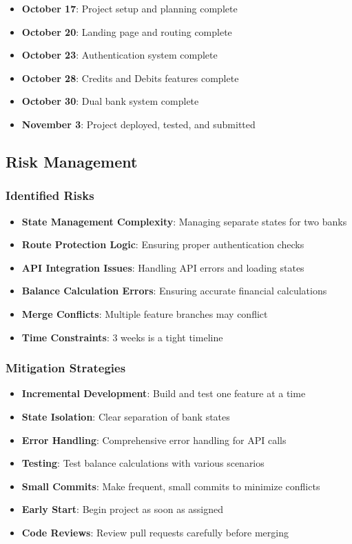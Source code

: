 \documentclass[11pt,a4paper]{article}
\begin{document}
\begin{itemize}[leftmargin=*]
    \item \textbf{October 17}: Project setup and planning complete
    \item \textbf{October 20}: Landing page and routing complete
    \item \textbf{October 23}: Authentication system complete
    \item \textbf{October 28}: Credits and Debits features complete
    \item \textbf{October 30}: Dual bank system complete
    \item \textbf{November 3}: Project deployed, tested, and submitted
\end{itemize}

\subsection{Risk Management}

\subsubsection{Identified Risks}
\begin{itemize}[leftmargin=*]
    \item \textbf{State Management Complexity}: Managing separate states for two banks
    \item \textbf{Route Protection Logic}: Ensuring proper authentication checks
    \item \textbf{API Integration Issues}: Handling API errors and loading states
    \item \textbf{Balance Calculation Errors}: Ensuring accurate financial calculations
    \item \textbf{Merge Conflicts}: Multiple feature branches may conflict
    \item \textbf{Time Constraints}: 3 weeks is a tight timeline
\end{itemize}

\subsubsection{Mitigation Strategies}
\begin{itemize}[leftmargin=*]
    \item \textbf{Incremental Development}: Build and test one feature at a time
    \item \textbf{State Isolation}: Clear separation of bank states
    \item \textbf{Error Handling}: Comprehensive error handling for API calls
    \item \textbf{Testing}: Test balance calculations with various scenarios
    \item \textbf{Small Commits}: Make frequent, small commits to minimize conflicts
    \item \textbf{Early Start}: Begin project as soon as assigned
    \item \textbf{Code Reviews}: Review pull requests carefully before merging
\end{itemize}
\end{document}
